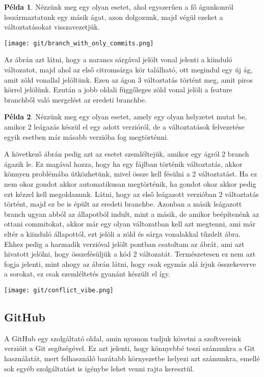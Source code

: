 \documentclass{article}
\theoremstyle{definition}
\theoremstyle{theorem}
\newtheorem{example}{Példa}
\begin{document}
\begin{example}
Nézzünk meg egy olyan esetet, ahol egyszerűen a fő águnkonról leszármaztatunk egy másik ágat, azon dolgozunk, majd végül ezeket a változtatásokat visszavezetjük.
\begin{center}
    \texttt{[image: git/branch\_with\_only\_commits.png]}
\end{center}
\end{example}

Az ábrán azt látni, hogy a narancs sárgával jelölt vonal jelenti a kiinduló változatot, majd ahol az első citromsárga kör található, ott megindul egy új ág, amit zöld vonallal jelöltünk. Ezen az ágon 3 változtatás történt meg, amit piros körrel jelölünk. Ezután a jobb oldali függőleges zöld vonal jelöli a feature branchből való mergelést az eredeti branchbe.


\begin{example}
Nézzünk meg egy olyan esetet, amely egy olyan helyzetet mutat be, amikor 2 leágazás készül el egy adott verzióról, de a változtatások felvezetése egyik esetben már másabb verzióba fog megtörténni.
\end{example}
A következő ábrán pedig azt az esetet szemléltejük, amikor egy ágról 2 branch ágazik le. Ez magával hozza, hogy ha egy fájlban történik változtatás, akkor könnyen problémába ütközhetünk, mivel össze kell fésülni a 2 változtatást. Ha ez nem okoz gondot akkor automatikusan megtörténik, ha gondot okoz akkor pedig ezt kézzel kell megoldanunk. Látni, hogy az első leágazott verzióban 2 változtatás történt, majd ez be is épült az eredeti branchbe. Azonban a másik leágazott branch ugyan abból az állapotból indult, mint a másik, de amikor beépítenénk az ottani commitokat, akkor már egy olyan változatban kell azt megtenni, ami már eltér a kiinduló állapottól, ezt jelöli a zöld és sárga vonalakkal tűzdelt ábra.
Ehhez pedig a harmadik verzióval jelölt pontban csatoltam az ábrát, ami azt hivatott jelölni, hogy összefésüljük a kód 2 változatát. Természetesen ez nem azt fogja jelenti, mint ahogy az ábrán látni, hogy csak egymás alá írjuk összekeverve a sorokat, ez csak szemléltetés gyanánt készült el így.
\begin{center}
    \texttt{[image: git/conflict\_vibe.png]}
\end{center}
\subsection{GitHub}
A GitHub egy szolgáltató oldal, amin nyomon tudjuk követni a szoftvereink verzióit a Git segítségével. Ez azt jelenti, hogy könnyebbé teszi számunkra a Git használatát, mert felhasználó barátabb környezetbe helyezi azt számunkra, emellé sok egyéb szolgáltatást is igénybe lehet venni rajta keresztül.
\end{document}
